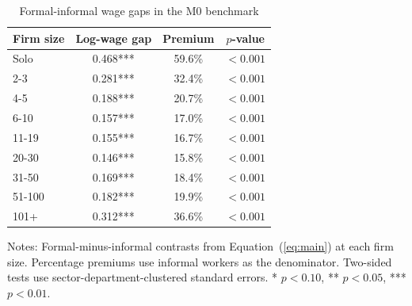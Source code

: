 \begin{table}[htbp]
  \centering
  \caption{Formal-informal wage gaps in the M0 benchmark}
  \label{tab:preferred-formality-gap}
  \small
  \begin{tabular}{lccc}
    \toprule
    Firm size & Log-wage gap & Premium & $p$-value \\
    \midrule
    Solo & 0.468*** & 59.6\% & $<0.001$ \\
    2-3 & 0.281*** & 32.4\% & $<0.001$ \\
    4-5 & 0.188*** & 20.7\% & $<0.001$ \\
    6-10 & 0.157*** & 17.0\% & $<0.001$ \\
    11-19 & 0.155*** & 16.7\% & $<0.001$ \\
    20-30 & 0.146*** & 15.8\% & $<0.001$ \\
    31-50 & 0.169*** & 18.4\% & $<0.001$ \\
    51-100 & 0.182*** & 19.9\% & $<0.001$ \\
    101+ & 0.312*** & 36.6\% & $<0.001$ \\
    \bottomrule
  \end{tabular}
  \vspace{0.3em}
  \begin{minipage}{0.95\textwidth}
  \footnotesize
  Notes: Formal-minus-informal contrasts from Equation~(\ref{eq:main}) at each firm size. Percentage premiums use informal workers as the denominator. Two-sided tests use sector-department-clustered standard errors. * $p<0.10$, ** $p<0.05$, *** $p<0.01$.
  \end{minipage}
\end{table}
